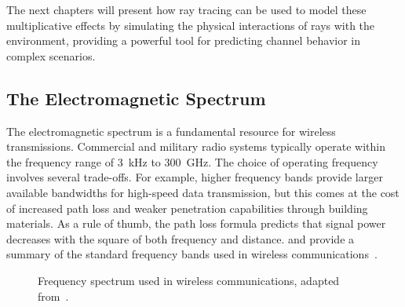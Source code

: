 The next chapters will present how ray tracing can be used to model these multiplicative effects by simulating the physical interactions of rays with the environment, providing a powerful tool for predicting channel behavior in complex scenarios.

\subsection{The Electromagnetic Spectrum}

The electromagnetic spectrum is a fundamental resource for wireless transmissions. Commercial and military radio systems typically operate within the frequency range of \qty{3}{\kilo\hertz} to \qty{300}{\giga\hertz}. The choice of operating frequency involves several trade-offs. For example, higher frequency bands provide larger available bandwidths for high-speed data transmission, but this comes at the cost of increased path loss and weaker penetration capabilities through building materials. As a rule of thumb, the  path loss formula predicts that signal power decreases with the square of both frequency and distance.  and  provide a summary of the standard frequency bands used in wireless communications~.

\begin{figure}
  \centering
  \caption{Frequency spectrum used in wireless communications, adapted from~\cite[Fig.~1.6]{Saunders2024}.}
\end{figure}

